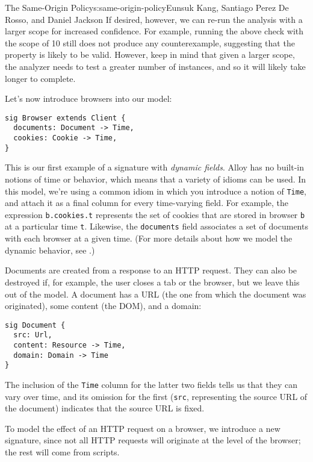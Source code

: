 \begin{aosachapter}{The Same-Origin Policy}{s:same-origin-policy}{Eunsuk Kang, Santiago Perez De Rosso, and Daniel Jackson}
If desired, however, we can re-run the analysis with a larger scope for
increased confidence. For example, running the above check with the
scope of 10 still does not produce any counterexample, suggesting that
the property is likely to be valid. However, keep in mind that given a
larger scope, the analyzer needs to test a greater number of instances,
and so it will likely take longer to complete.

\label{browser}

Let's now introduce browsers into our model:

\begin{verbatim}
sig Browser extends Client {
  documents: Document -> Time,
  cookies: Cookie -> Time,
}
\end{verbatim}

This is our first example of a signature with \emph{dynamic fields}.
Alloy has no built-in notions of time or behavior, which means that a
variety of idioms can be used. In this model, we're using a common idiom
in which you introduce a notion of \texttt{Time}, and attach it as a
final column for every time-varying field. For example, the expression
\texttt{b.cookies.t} represents the set of cookies that are stored in
browser \texttt{b} at a particular time \texttt{t}. Likewise, the
\texttt{documents} field associates a set of documents with each browser
at a given time. (For more details about how we model the dynamic
behavior, see .)

Documents are created from a response to an HTTP request. They can also
be destroyed if, for example, the user closes a tab or the browser, but
we leave this out of the model. A document has a URL (the one from which
the document was originated), some content (the DOM), and a domain:

\begin{verbatim}
sig Document {
  src: Url,
  content: Resource -> Time,
  domain: Domain -> Time
}
\end{verbatim}

The inclusion of the \texttt{Time} column for the latter two fields
tells us that they can vary over time, and its omission for the first
(\texttt{src}, representing the source URL of the document) indicates
that the source URL is fixed.

To model the effect of an HTTP request on a browser, we introduce a new
signature, since not all HTTP requests will originate at the level of
the browser; the rest will come from scripts.


\end{aosachapter}
